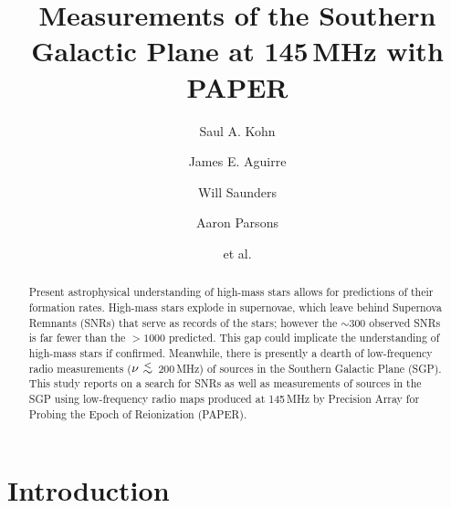 \documentclass[preprint2,epsf,epsfig,graphics]{emulateapj}
\newcommand {\aplt} {\ {\raise-.5ex\hbox{$\buildrel<\over\sim$}}\ }
\begin{document}
\title{Measurements of the Southern Galactic Plane at 145\,MHz with PAPER}

\author{Saul A. Kohn}
\author{James E. Aguirre}
\author{Will Saunders}
\author{Aaron Parsons}
\author{et al.}



\begin{abstract}
Present astrophysical understanding of high-mass stars allows for predictions of their formation rates.  High-mass stars explode in supernovae, which leave behind Supernova Remnants (SNRs) that serve as records of the stars; however the $\sim$300 observed SNRs is far fewer than the $>1000$ predicted.  This gap could implicate the understanding of high-mass stars if confirmed. 
Meanwhile, there is presently a dearth of low-frequency radio measurements ($\nu\aplt$200\,MHz) of sources in the Southern Galactic Plane (SGP).
This study reports on a search for SNRs as well as measurements of sources in the SGP using low-frequency radio maps produced at 145\,MHz by Precision Array for Probing the Epoch of Reionization (PAPER).
\end{abstract}

\section{Introduction}
\end{document}
